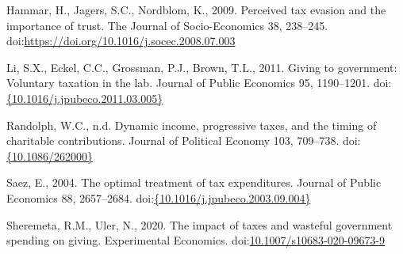 \documentclass[ review  , 3p ]{elsarticle}
\begin{document}
  \leavevmode\hypertarget{ref-Hammar2009}{}%
  Hammar, H., Jagers, S.C., Nordblom, K., 2009. Perceived tax evasion and the importance of trust. The Journal of Socio-Economics 38, 238--245. doi:\href{https://doi.org/https://doi.org/10.1016/j.socec.2008.07.003}{https://doi.org/10.1016/j.socec.2008.07.003}
  
  \leavevmode\hypertarget{ref-Li2011}{}%
  Li, S.X., Eckel, C.C., Grossman, P.J., Brown, T.L., 2011. Giving to government: Voluntary taxation in the lab. Journal of Public Economics 95, 1190--1201. doi:\href{https://doi.org/\%7B10.1016/j.jpubeco.2011.03.005\%7D}{\{10.1016/j.jpubeco.2011.03.005\}}
  
  \leavevmode\hypertarget{ref-Randolph1995}{}%
  Randolph, W.C., n.d. Dynamic income, progressive taxes, and the timing of charitable contributions. Journal of Political Economy 103, 709--738. doi:\href{https://doi.org/\%7B10.1086/262000\%7D}{\{10.1086/262000\}}
  
  \leavevmode\hypertarget{ref-Saez2004}{}%
  Saez, E., 2004. The optimal treatment of tax expenditures. Journal of Public Economics 88, 2657--2684. doi:\href{https://doi.org/\%7B10.1016/j.jpubeco.2003.09.004\%7D}{\{10.1016/j.jpubeco.2003.09.004\}}
  
  \leavevmode\hypertarget{ref-Sheremeta2020}{}%
  Sheremeta, R.M., Uler, N., 2020. The impact of taxes and wasteful government spending on giving. Experimental Economics. doi:\href{https://doi.org/10.1007/s10683-020-09673-9}{10.1007/s10683-020-09673-9}
\end{document}

